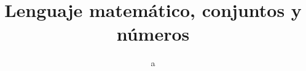 \documentclass[a4paper]{scrbook}
\begin{document}
\title{Lenguaje matemático, conjuntos y números}
\author{a}
\maketitle
\tableofcontents







\end{document}
